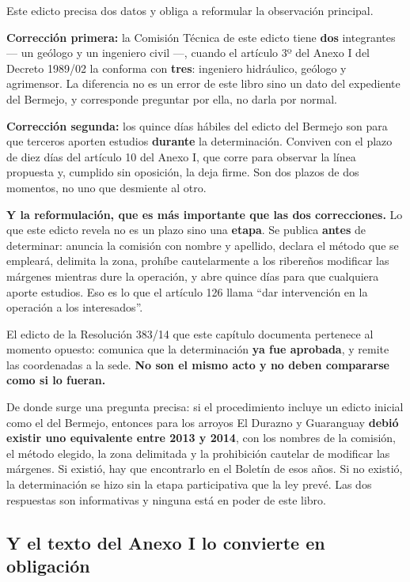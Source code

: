 \begin{cautela}
Este edicto precisa dos datos y obliga a reformular la observación principal.

\textbf{Corrección primera:} la Comisión Técnica de este edicto tiene \textbf{dos} integrantes --- un geólogo y un ingeniero civil ---, cuando el artículo 3º del Anexo I del Decreto 1989/02 la conforma con \textbf{tres}: ingeniero hidráulico, geólogo y agrimensor. La diferencia no es un error de este libro sino un dato del expediente del Bermejo, y corresponde preguntar por ella, no darla por normal.

\textbf{Corrección segunda:} los quince días hábiles del edicto del Bermejo son para que terceros aporten estudios \textbf{durante} la determinación. Conviven con el plazo de diez días del artículo 10 del Anexo I, que corre para observar la línea propuesta y, cumplido sin oposición, la deja firme. Son dos plazos de dos momentos, no uno que desmiente al otro.

\textbf{Y la reformulación, que es más importante que las dos correcciones.} Lo que este edicto revela no es un plazo sino una \textbf{etapa}. Se publica \textbf{antes} de determinar: anuncia la comisión con nombre y apellido, declara el método que se empleará, delimita la zona, prohíbe cautelarmente a los ribereños modificar las márgenes mientras dure la operación, y abre quince días para que cualquiera aporte estudios. Eso es lo que el artículo 126 llama ``dar intervención en la operación a los interesados''.

El edicto de la Resolución 383/14 que este capítulo documenta pertenece al momento opuesto: comunica que la determinación \textbf{ya fue aprobada}, y remite las coordenadas a la sede. \textbf{No son el mismo acto y no deben compararse como si lo fueran.}

De donde surge una pregunta precisa: si el procedimiento incluye un edicto inicial como el del Bermejo, entonces para los arroyos El Durazno y Guaranguay \textbf{debió existir uno equivalente entre 2013 y 2014}, con los nombres de la comisión, el método elegido, la zona delimitada y la prohibición cautelar de modificar las márgenes. Si existió, hay que encontrarlo en el Boletín de esos años. Si no existió, la determinación se hizo sin la etapa participativa que la ley prevé. Las dos respuestas son informativas y ninguna está en poder de este libro.
\end{cautela}

\subsection*{Y el texto del Anexo I lo convierte en obligación}

